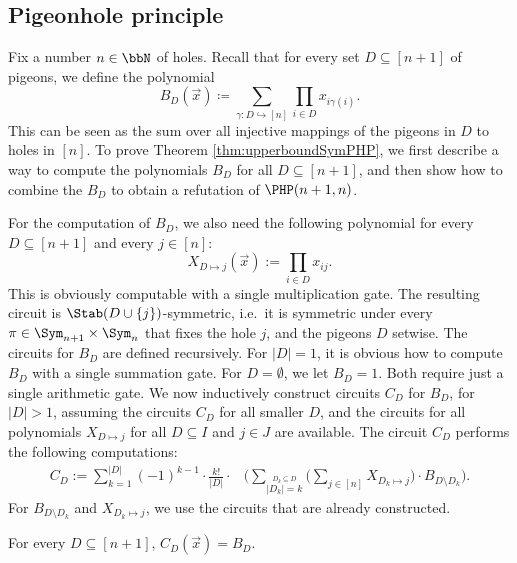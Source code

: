 \documentclass[a4paper,UKenglish,cleveref, autoref, thm-restate]{lipics-v2021}
\begin{document}
\subsection{Pigeonhole principle}

\PHPupperBound*

Fix a number $n \in \bbN$ of holes.
Recall that for every set $D \subseteq [n+1]$ of pigeons, we define the polynomial
\[
B_D(\vec x) \coloneqq \sum_{\gamma \colon D \hookrightarrow [n]} \prod_{i \in D} x_{i\gamma(i)}.
\]
This can be seen as the sum over all injective mappings of the pigeons in $D$ to holes in $[n]$.
To prove Theorem \ref{thm:upperboundSymPHP}, we first describe a way to compute the polynomials $B_D$ for all $D \subseteq [n+1]$, and then show how to combine the $B_D$ to obtain a refutation of $\PHP(n+1,n)$.

For the computation of $B_D$, we also need the following polynomial for every $D \subseteq [n+1]$ and every $j \in [n]$: 
\[
X_{D \mapsto j}(\vec x) := \prod_{i \in D} x_{ij}.        
\]
This is obviously computable with a single multiplication gate. The resulting circuit is $\Stab(D \cup \{j\})$-symmetric, i.e.\ it is symmetric under every $\pi \in \Sym_{n+1} \times \Sym_n$ that fixes the hole $j$, and the pigeons $D$ setwise. 
The circuits for $B_D$ are defined recursively.
For $|D| = 1$, it is obvious how to compute $B_D$ with a single summation gate. For $D = \emptyset$, we let $B_D = 1$.
Both require just a single arithmetic gate. 
We now inductively construct circuits $C_D$ for $B_D$, for $|D| > 1$, assuming the circuits $C_D$ for all smaller $D$, and the circuits for all polynomials $X_{D \mapsto j}$ for all $D \subseteq I$ and $j \in J$ are available. The circuit $C_D$ performs the following computations:
\begin{align*}
	C_D := \sum_{k=1}^{|D|} (-1)^{k-1} \cdot \frac{k!}{|D|} \cdot &\Big(\sum_{\stackrel{D_k \subseteq D}{|D_k| = k}} \Big(\sum_{j \in [n]} X_{D_k \mapsto j}\Big) \cdot B_{D \setminus D_k} \Big).
\end{align*}	
For $B_{D \setminus D_k}$ and $X_{D_k \mapsto j}$, we use the circuits that are already constructed.
\begin{lemma}
	\label{lem:bijectionCircuitCorrect}
	For every $D \subseteq [n+1]$, $C_D(\vec x) = B_D$.
\end{lemma}	
\end{document}
